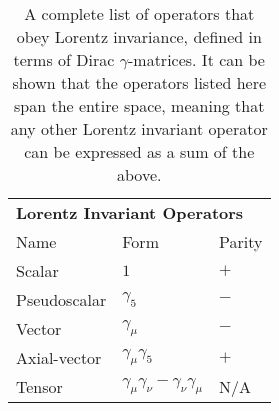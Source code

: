 %
%
%
\begin{table}[h!!!!t]
	\begin{center}
	\begin{tabular}{ l  l  l}
		\multicolumn{3}{l}{ \textbf{Lorentz Invariant Operators}}
		\\  %
		\multicolumn{1}{l}{Name} 		& \multicolumn{1}{l}{ Form}   								& \multicolumn{1}{l}{Parity}   	
		\\  \hline
		Scalar 			   				& $1$														& $+$									
		\\
		Pseudoscalar \;\;\;\;\;\;\;		& $\gamma_5$									 			& $-$				
		\\
		Vector							& $\gamma_\mu$												& $-$				
		\\
		Axial-vector					& $\gamma_\mu \gamma_5$										& $+$
		\\
		Tensor							& $\gamma_\mu \gamma_\nu - \gamma_\nu \gamma_\mu$ \;\;		& N/A									
		\\  \hline
	\end{tabular}
	\end{center}
	\caption[Lorentz Invariant Operators]{A complete list of operators that obey Lorentz invariance, defined in terms of Dirac $\gamma$-matrices.  It can be shown that the operators listed here span the entire space, meaning that any other Lorentz invariant operator can be expressed as a sum of the above. }
	\label{table:dirac_matrix_operators}
\end{table}

